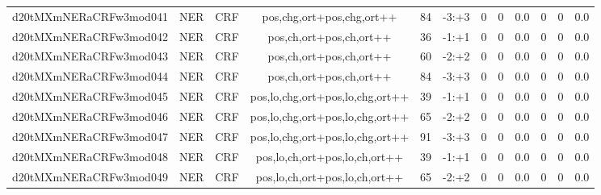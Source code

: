 \documentclass[a4paper]{article}
\begin{document}
\begin{landscape}
\begin{center}
\begin{tabular}{ |c|c|c|c|c|c|c|c|c|c|c|c|}
 
 	
 	\small{ d20tMXmNERaCRFw3mod041 } & \small{ NER} & \small{  CRF }  & pos,chg,ort+pos,chg,ort++  &  84 &  \small{  -3:+3 }  &  0 & 0 & 0.0  &  0 & 0 & 0.0 \\
 	

 
 	
 	\small{ d20tMXmNERaCRFw3mod042 } & \small{ NER} & \small{  CRF }  & pos,ch,ort+pos,ch,ort++  &  36 &  \small{  -1:+1 }  &  0 & 0 & 0.0  &  0 & 0 & 0.0 \\
 	

 
 	
 	\small{ d20tMXmNERaCRFw3mod043 } & \small{ NER} & \small{  CRF }  & pos,ch,ort+pos,ch,ort++  &  60 &  \small{  -2:+2 }  &  0 & 0 & 0.0  &  0 & 0 & 0.0 \\
 	

 
 	
 	\small{ d20tMXmNERaCRFw3mod044 } & \small{ NER} & \small{  CRF }  & pos,ch,ort+pos,ch,ort++  &  84 &  \small{  -3:+3 }  &  0 & 0 & 0.0  &  0 & 0 & 0.0 \\
 	

 
 	
 	\small{ d20tMXmNERaCRFw3mod045 } & \small{ NER} & \small{  CRF }  & pos,lo,chg,ort+pos,lo,chg,ort++  &  39 &  \small{  -1:+1 }  &  0 & 0 & 0.0  &  0 & 0 & 0.0 \\
 	

 
 	
 	\small{ d20tMXmNERaCRFw3mod046 } & \small{ NER} & \small{  CRF }  & pos,lo,chg,ort+pos,lo,chg,ort++  &  65 &  \small{  -2:+2 }  &  0 & 0 & 0.0  &  0 & 0 & 0.0 \\
 	

 
 	
 	\small{ d20tMXmNERaCRFw3mod047 } & \small{ NER} & \small{  CRF }  & pos,lo,chg,ort+pos,lo,chg,ort++  &  91 &  \small{  -3:+3 }  &  0 & 0 & 0.0  &  0 & 0 & 0.0 \\
 	

 
 	
 	\small{ d20tMXmNERaCRFw3mod048 } & \small{ NER} & \small{  CRF }  & pos,lo,ch,ort+pos,lo,ch,ort++  &  39 &  \small{  -1:+1 }  &  0 & 0 & 0.0  &  0 & 0 & 0.0 \\
 	

 
 	
 	\small{ d20tMXmNERaCRFw3mod049 } & \small{ NER} & \small{  CRF }  & pos,lo,ch,ort+pos,lo,ch,ort++  &  65 &  \small{  -2:+2 }  &  0 & 0 & 0.0  &  0 & 0 & 0.0 \\
 	


\end{tabular}
\end{center}
\end{landscape}
\end{document}
